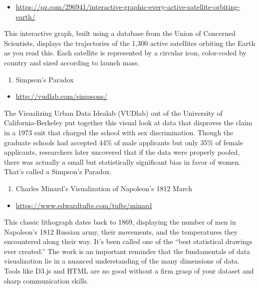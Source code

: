 \documentclass[]{book}
\providecommand{\tightlist}{%
  \setlength{\itemsep}{0pt}\setlength{\parskip}{0pt}}
\theoremstyle{definition}
\theoremstyle{definition}
\theoremstyle{definition}
\theoremstyle{remark}
\begin{document}
\begin{itemize}
\tightlist
\item
  \url{https://qz.com/296941/interactive-graphic-every-active-satellite-orbiting-earth/}
\end{itemize}

This interactive graph, built using a database from the Union of
Concerned Scientists, displays the trajectories of the 1,300 active
satellites orbiting the Earth as you read this. Each satellite is
represented by a circular icon, color-coded by country and sized
according to launch mass.

\begin{enumerate}
\def\labelenumi{\arabic{enumi}.}
\setcounter{enumi}{1}
\tightlist
\item
  Simpson's Paradox
\end{enumerate}

\begin{itemize}
\tightlist
\item
  \url{http://vudlab.com/simpsons/}
\end{itemize}

The Visualizing Urban Data Idealab (VUDlab) out of the University of
California-Berkeley put together this visual look at data that disproves
the claim in a 1973 suit that charged the school with sex
discrimination. Though the graduate schools had accepted 44\% of male
applicants but only 35\% of female applicants, researchers later
uncovered that if the data were properly pooled, there was actually a
small but statistically significant bias in favor of women. That's
called a Simpson's Paradox.

\begin{enumerate}
\def\labelenumi{\arabic{enumi}.}
\setcounter{enumi}{2}
\tightlist
\item
  Charles Minard's Visualization of Napoleon's 1812 March
\end{enumerate}

\begin{itemize}
\tightlist
\item
  \url{https://www.edwardtufte.com/tufte/minard}
\end{itemize}

This classic lithograph dates back to 1869, displaying the number of men
in Napoleon's 1812 Russian army, their movements, and the temperatures
they encountered along their way. It's been called one of the ``best
statistical drawings ever created.'' The work is an important reminder
that the fundamentals of data visualization lie in a nuanced
understanding of the many dimensions of data. Tools like D3.js and HTML
are no good without a firm grasp of your dataset and sharp communication
skills.
\end{document}
